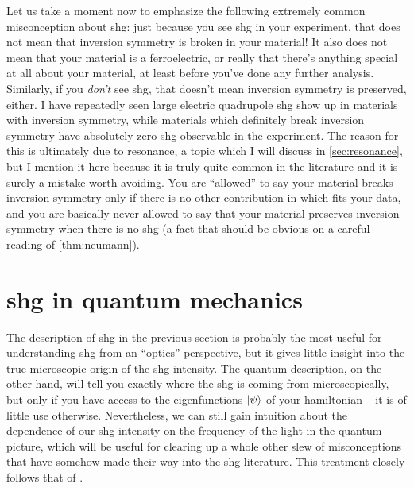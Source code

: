 Let us take a moment now to emphasize the following extremely common misconception about \gls{shg}: just because you see \gls{shg} in your experiment, that does not mean that inversion symmetry is broken in your material!
It also does not mean that your material is a ferroelectric, or really that there's anything special at all about your material, at least before you've done any further analysis.
Similarly, if you \emph{don't} see \gls{shg}, that doesn't mean inversion symmetry is preserved, either.
I have repeatedly seen large electric quadrupole \gls{shg} show up in materials with inversion symmetry, while materials which definitely break inversion symmetry have absolutely zero \gls{shg} observable in the experiment.
The reason for this is ultimately due to resonance, a topic which I will discuss in \cref{sec:resonance}, but I mention it here because it is truly quite common in the literature and it is surely a mistake worth avoiding.
You are ``allowed'' to say your material breaks inversion symmetry only if there is no other contribution in  which fits your data, and you are basically never allowed to say that your material preserves inversion symmetry when there is no \gls{shg} (a fact that should be obvious on a careful reading of \cref{thm:neumann}).

\section{\Gls{shg} in quantum mechanics}

The description of \gls{shg} in the previous section is probably the most useful for understanding \gls{shg} from an ``optics'' perspective, but it gives little insight into the true microscopic origin of the \gls{shg} intensity.
The quantum description, on the other hand, will tell you exactly where the \gls{shg} is coming from microscopically, but only if you have access to the eigenfunctions $\ket{\psi}$ of your hamiltonian -- it is of little use otherwise.
Nevertheless, we can still gain intuition about the dependence of our \gls{shg} intensity on the frequency of the light in the quantum picture, which will be useful for clearing up a whole other slew of misconceptions that have somehow made their way into the \gls{shg} literature.
This treatment closely follows that of .

